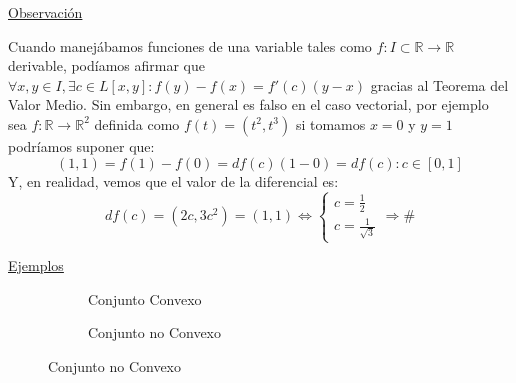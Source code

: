 \documentclass[10pt,a4paper,openright]{book}
\theoremstyle{break}
\begin{document}
\underline{Observación}

Cuando manejábamos funciones de una variable tales como $f: I \subset \mathbb{R} \to \mathbb{R}$ derivable, podíamos afirmar que $\forall x,y \in I, \exists c \in L[x,y] : f(y) - f(x) = f'(c)(y-x)$ gracias al Teorema del Valor Medio. Sin embargo, en general es falso en el caso vectorial, por ejemplo sea $f: \mathbb{R} \to \mathbb{R}^2$ definida como $f(t)=(t^2, t^3)$ si tomamos $x = 0$ y $y=1$ podríamos suponer que:
$$(1,1) = f(1) - f(0) = df(c)(1-0) = df(c) : c \in [0,1]$$
Y, en realidad, vemos que el valor de la diferencial es:
$$df(c) = (2c,3c^2) = (1,1) \Leftrightarrow \begin{cases} c = \frac{1}{2} \\ c = \frac{1}{\sqrt{3}}\end{cases} \Rightarrow \#$$
\newpage

\underline{Ejemplos}
    \begin{figure}[h]
    \centering
    
    \begin{subfigure}[h]{0.23\textwidth}
    \caption{Conjunto Convexo}
    \end{subfigure}
    \hspace{2cm}
    \begin{subfigure}[h]{0.25\textwidth}
    \caption{Conjunto no Convexo}
    \end{subfigure}
	\end{figure}
\end{document}
